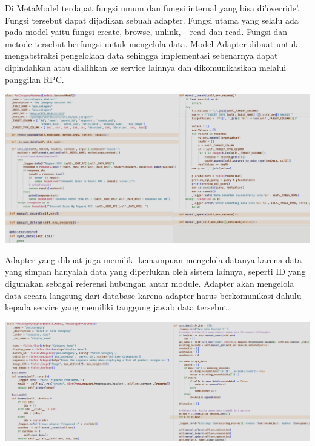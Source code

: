 Di MetaModel terdapat fungsi umum dan fungsi internal yang bisa di'override'. Fungsi tersebut dapat dijadikan sebuah adapter. Fungsi utama yang selalu ada pada model yaitu fungsi create, browse, unlink, \_read dan read. Fungsi dan metode tersebut berfungsi untuk mengelola data. Model Adapter dibuat untuk mengabstraksi pengelolaan data sehingga implementasi sebenarnya dapat dipindahkan atau dialihkan ke service lainnya dan dikomunikasikan melalui panggilan RPC.  


\begin{center}
	\includegraphics[width=14cm]{img/bab_4/strangle_1.png}
	\label{fig:strangle_1}
\end{center}

Adapter yang dibuat juga memiliki kemampuan mengelola datanya karena data yang simpan hanyalah data yang diperlukan oleh sistem lainnya, seperti ID yang digunakan sebagai referensi hubungan antar module. Adapter akan mengelola data secara langsung dari database karena adapter harus berkomunikasi dahulu kepada service yang memiliki tanggung jawab data tersebut.


\begin{center}
	\includegraphics[width=14cm]{img/bab_4/strangle_2.png}
	\label{fig:strangle_2}
\end{center}

